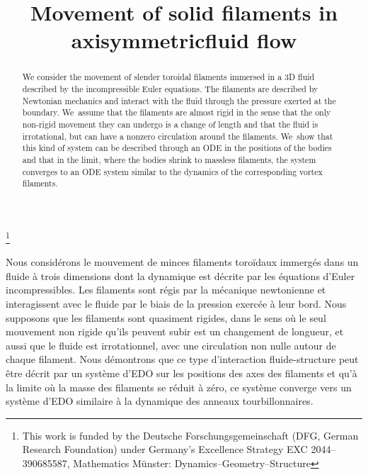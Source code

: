 \documentclass[JEP,XML,SOM,Unicode,published]{cedram}
\theoremstyle{definition}
\begin{document}
\title{Movement of solid filaments in axisymmetric\nobreakspace fluid flow}

\author[\initial{D.} \lastname{Meyer}]{ }
\address{Instituto de Ciencias Matemáticas,\\
Calle Nicolás Cabrera 13-15, 28049 Madrid, Spain}

\thanks{This work is funded by the Deutsche Forschungsgemeinschaft (DFG, German Research Foundation) under Germany’s Excellence Strategy EXC 2044–390685587, Mathematics Münster: Dynamics–Geometry–Structure}

\begin{abstract}
We consider the movement of slender toroidal filaments immersed in a 3D fluid described by the incompressible Euler equations. The filaments are described by Newtonian mechanics and interact with the fluid through the pressure exerted at the boundary. We~assume that the filaments are almost rigid in the sense that the only non-rigid movement they can undergo is a change of length and that the fluid is irrotational, but can have a nonzero circulation around the filaments. We~show that this kind of system can be described through an ODE in the positions of the bodies and that in the limit, where the bodies shrink to massless filaments, the system converges to an ODE system similar to the dynamics of the corresponding vortex filaments.
\end{abstract}





\begin{altabstract}
Nous considérons le mouvement de minces filaments toroïdaux immergés dans un fluide à trois dimensions dont la dynamique est décrite par les équations d'Euler incompressibles. Les filaments sont régis par la mécanique newtonienne et interagissent avec le fluide par le biais de la pression exercée à leur bord. Nous supposons que les filaments sont quasiment rigides, dans le sens où le seul mouvement non rigide qu'ils peuvent subir est un changement de longueur, et aussi que le fluide est irrotationnel, avec une circulation non nulle autour de chaque filament. Nous démontrons que ce type d'interaction fluide-structure peut être décrit par un système d'EDO sur les positions des axes des filaments et qu'à la limite où la masse des filaments se réduit à zéro, ce système converge vers un système d'EDO similaire à la dynamique des anneaux tourbillonnaires.
\end{altabstract}
\end{document}
